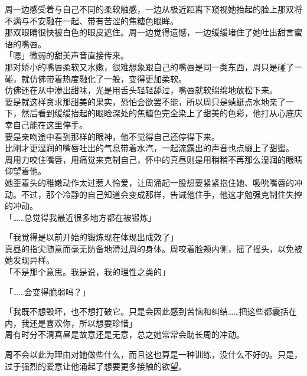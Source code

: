 周一边感受着与自己不同的柔软触感，一边从极近距离下窥视她抬起的脸上那双将不满与不安融在一起、带有苦涩的焦糖色眼眸。\\

那双眼睛很快被白色的眼皮遮住。周一边觉得遗憾，一边缓缓堵住了她吐出甜言蜜语的嘴唇。\\

「嗯」微弱的甜美声音直接传来。\\

那对娇小的嘴唇柔软又水嫩，很难想象跟自己的嘴唇是同一类东西，周只是碰了一碰，就仿佛带着热度融化了一般，变得更加柔软。\\

仿佛还在从中渗出甜味，光是用舌头轻轻舔过，嘴唇就软绵绵地放松下来。\\

要是就这样贪求那甜美的果实，恐怕会欲罢不能，所以周只是蜻蜓点水地亲了一下，然后看到缓缓抬起的眼睑深处的焦糖色完全染上了甜美的色彩，他打从心底庆幸自己能在这里停手。\\

要是亲吻途中看到那样的眼神，他不觉得自己还停得下来。\\

比刚才更湿润的嘴唇吐出的气息带着水汽，一起流露出的声音也点缀上了甜蜜。\\

周用力咬住嘴唇，用痛觉来克制自己，怀中的真昼则是用稍稍不再那么湿润的眼睛仰望着他。\\

她歪着头的稚嫩动作太过惹人怜爱，让周涌起一股想要紧紧抱住她、吸吮嘴唇的冲动。不过，那个冷静的自己知道会变成那样，告诫他住手，他这才勉强克制住失控的冲动。\\

「……总觉得我最近很多地方都在被锻炼」

「我觉得是以前开始的锻炼现在体现出成效了」\\

真昼的指尖随意而毫无防备地滑过周的身体。周咬着脸颊内侧，摇了摇头，以免被她发现异样。\\

「不是那个意思。我是说，我的理性之类的」

「……会变得脆弱吗？」

「我既不想毁坏，也不想打破它。只是会因此感到苦恼和纠结……把这些都囊括在内，我还是喜欢你，所以想要珍惜」\\

周有时分不清真昼是故意还是无意，总之她常常会助长周的冲动。

周不会以此为理由对她做些什么，而且这也算是一种训练，没什么不好的。只是，过于强烈的爱意让他涌起了想要更多接触的欲望。\\


